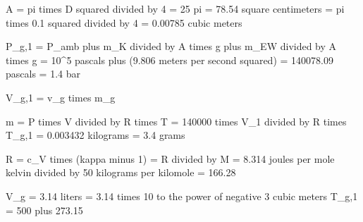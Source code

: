 A = pi times D squared divided by 4 = 25 pi = 78.54 square centimeters  
= pi times 0.1 squared divided by 4 = 0.00785 cubic meters  

P_g,1 = P_amb plus m_K divided by A times g plus m_EW divided by A times g  
= 10^5 pascals plus (9.806 meters per second squared)  
= 140078.09 pascals  
= 1.4 bar  

V_g,1 = v_g times m_g  

m = P times V divided by R times T  
= 140000 times V_1 divided by R times T_g,1  
= 0.003432 kilograms = 3.4 grams  

R = c_V times (kappa minus 1) = R divided by M  
= 8.314 joules per mole kelvin divided by 50 kilograms per kilomole  
= 166.28  

V_g = 3.14 liters = 3.14 times 10 to the power of negative 3 cubic meters  
T_g,1 = 500 plus 273.15